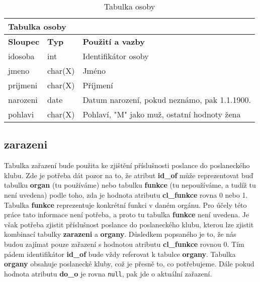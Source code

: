 \begin{center}
	\begin{longtable}{|l|l|p{9cm}|}
		\caption{Tabulka osoby
		} \label{table:osoby} \\
		
		\hline 
		
		\multicolumn{3}{|l|}{\textbf{Tabulka osoby
		}} \\
		
		\hline 
		
		\multicolumn{1}{|l|}{\textbf{Sloupec}} & \multicolumn{1}{l|}{\textbf{Typ}} & \multicolumn{1}{l|}{\textbf{Použití a vazby}} \\ 
		
		\endhead
		
		\hline 
		
		id\textunderscore osoba & int & Identifikátor osoby \\
		
		\hline 
		
		jmeno & char(X) & Jméno \\
		
		\hline 
		
		prijmeni & char(X) & Příjmení \\
		
		\hline 
		
		narozeni & date & Datum narození, pokud neznámo, pak 1.1.1900. \\
		
		\hline 
		
		pohlavi & char(X) & Pohlaví, "M" jako muž, ostatní hodnoty žena \\
		
		\hline 
		
		
	\end{longtable}
\end{center}

\subsection*{zarazeni}

Tabulka zařazení bude použita ke zjištění příslušnosti poslance do poslaneckého klubu. Zde je potřeba dát pozor na to, že atribut \textbf{id\_of} může reprezentovat buď tabulku \textbf{organ} (tu používáme) nebo tabulku \textbf{funkce} (tu nepoužíváme, a tudíž tu není uvedena) podle toho, zda je hodnota atributu \textbf{cl\_funkce} rovna 0 nebo 1. Tabulka \textbf{funkce} reprezentuje konkrétní funkci v daném orgánu. Pro účely této práce tato informace není potřeba, a proto tu tabulka \textbf{funkce} není uvedena. Je však potřeba zjistit příslušnost poslance do poslaneckého klubu, kterou lze zjistit kombinací tabulky \textbf{zarazeni} a \textbf{organy}. Důsledkem popsaného je to, že nás budou zajímat pouze zařazení \linebreak s hodnotou atributu \textbf{cl\_funkce} rovnou 0. Tím pádem identifikátor \textbf{id\_of} bude vždy referovat k tabulce \textbf{organy}. Tabulka \textbf{organy} obsahuje poslanecké kluby, což je přesně to, co potřebujeme. Dále pokud hodnota atributu \textbf{do\_o} je rovna \lstinline|null|, pak jde o aktuální zařazení.

